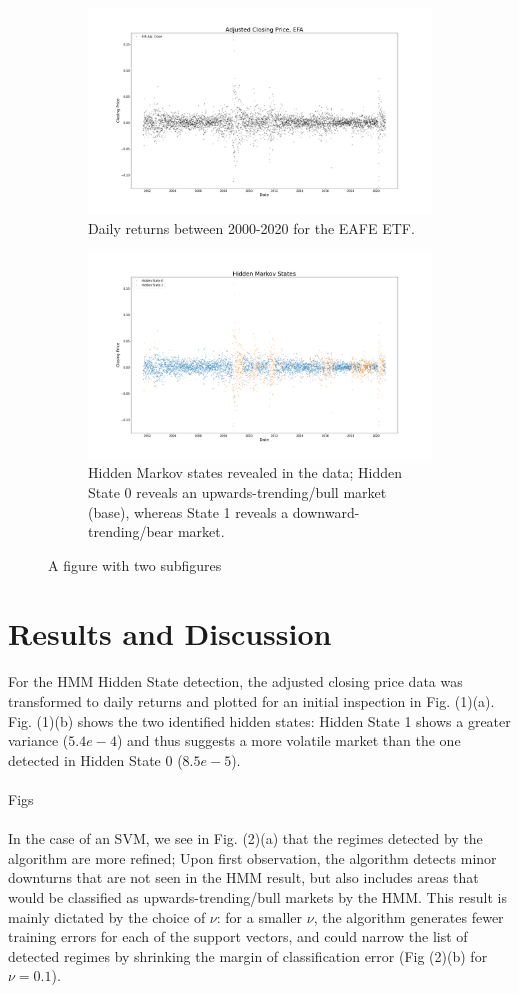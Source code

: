 \documentclass[]{hdsr}
\begin{document}
\begin{figure}
\begin{subfigure}{0.5\textwidth}
	\centering
	\includegraphics[width=0.4\linewidth]{graphics/adj_close_graph_pct_change}
	\caption{Daily returns between 2000-2020 for the EAFE ETF.}
	\label{fig:adj_close_pct}
\end{subfigure}
\begin{subfigure}{0.5\textwidth}
	\centering
	\includegraphics[width=0.4\linewidth]{graphics/hmm_graph_pct_change}
	\caption{Hidden Markov states revealed in the data; Hidden State 0 reveals an upwards-trending/bull market (base), whereas State 1 reveals a downward-trending/bear market.}
	\label{fig:adj_close_pct}
\end{subfigure}
\caption{A figure with two subfigures}
\label{fig:adj_close_hmm_vs_raw_pct}
\end{figure}

\section{Results and Discussion}
\label{sec4}
For the HMM Hidden State detection, the adjusted closing price data was transformed to daily returns and plotted for an initial inspection in Fig. (1)(a). Fig. (1)(b) shows the two identified hidden states: Hidden State 1 shows a greater variance ($5.4e-4$) and thus suggests a more volatile market than the one detected in Hidden State 0 ($8.5e-5$).\\
\\
Figs\\
\\
In the case of an SVM, we see in Fig. (2)(a) that the regimes detected by the algorithm are more refined; Upon first observation, the algorithm detects minor downturns that are not seen in the HMM result, but also includes areas that would be classified as upwards-trending/bull markets by the HMM. This result is mainly dictated by the choice of $\nu$: for a smaller $\nu$, the algorithm generates fewer training errors for each of the support vectors, and could narrow the list of detected regimes by shrinking the margin of classification error (Fig (2)(b) for $\nu=0.1$).\\
\end{document}
